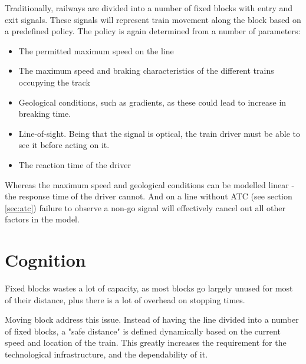 Traditionally, railways are divided into a number of fixed blocks with entry and exit signals. These signals will represent train movement along the block based on a predefined policy. The policy is again determined from a number of parameters:


\begin{itemize}
  \item The permitted maximum speed on the line
  \item The maximum speed and braking characteristics of the different trains occupying the track
  \item Geological conditions, such as gradients, as these could lead to increase in breaking time.
  \item Line-of-sight. Being that the signal is optical, the train driver must be able to see it before acting on it.
  \item The reaction time of the driver
\end{itemize}
Whereas the maximum speed and geological conditions can be modelled linear - the response time of the driver cannot. And on a line without ATC (see section \ref{sec:atc}) failure to observe a non-go signal will effectively cancel out all other factors in the model.


\section{Cognition}





Fixed blocks wastes a lot of capacity, as most blocks go largely unused for most of their distance, plus there is a lot of overhead on stopping times.

Moving block address this issue. Instead of having the line divided into a number of fixed blocks, a "safe distance" is defined dynamically based on the current speed and location of the train.
This greatly increases the requirement for the technological infrastructure, and the dependability of it.

